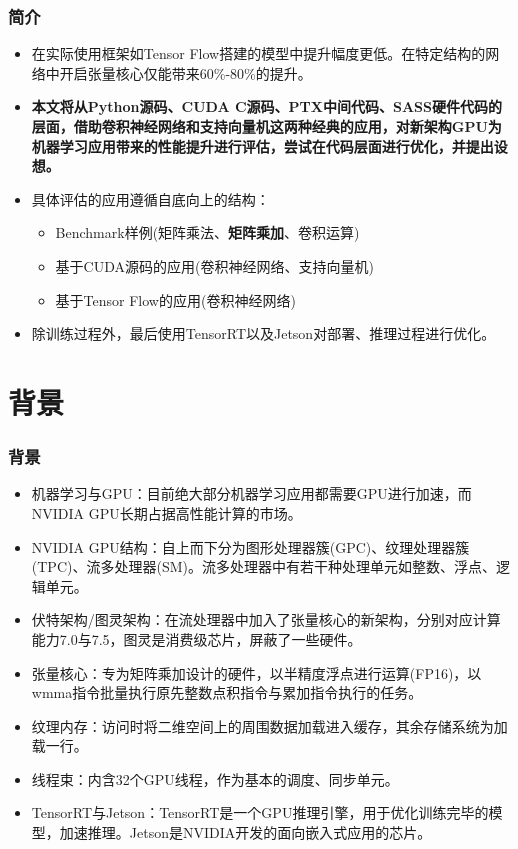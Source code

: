 \documentclass[10pt,aspectratio=169,mathserif]{beamer}
\begin{document}
	\begin{frame}
		\frametitle{简介}
		\begin{itemize}
			\item 在实际使用框架如Tensor Flow搭建的模型中提升幅度更低。在特定结构的网络中开启张量核心仅能带来60\%-80\%的提升。
			\item {\bf 本文将从Python源码、CUDA C源码、PTX中间代码、SASS硬件代码的层面，借助卷积神经网络和支持向量机这两种经典的应用，对新架构GPU为机器学习应用带来的性能提升进行评估，尝试在代码层面进行优化，并提出设想。}
			\item 具体评估的应用遵循自底向上的结构：
				\begin{itemize}
					\item Benchmark样例(矩阵乘法、\textbf{矩阵乘加}、卷积运算)
					\item 基于CUDA源码的应用(卷积神经网络、支持向量机)
					\item 基于Tensor Flow的应用(卷积神经网络)
				\end{itemize}
			\item 除训练过程外，最后使用TensorRT以及Jetson对部署、推理过程进行优化。
		\end{itemize}
	\end{frame}

	\section{背景}
	\begin{frame}
		\frametitle{背景}
		\begin{itemize}
			\item 机器学习与GPU：目前绝大部分机器学习应用都需要GPU进行加速，而NVIDIA GPU长期占据高性能计算的市场。
			\item NVIDIA GPU结构：自上而下分为图形处理器簇(GPC)、纹理处理器簇(TPC)、流多处理器(SM)。流多处理器中有若干种处理单元如整数、浮点、逻辑单元。
			\item 伏特架构/图灵架构：在流处理器中加入了张量核心的新架构，分别对应计算能力7.0与7.5，图灵是消费级芯片，屏蔽了一些硬件。
			\item 张量核心：专为矩阵乘加设计的硬件，以半精度浮点进行运算(FP16)，以wmma指令批量执行原先整数点积指令与累加指令执行的任务。
			\item 纹理内存：访问时将二维空间上的周围数据加载进入缓存，其余存储系统为加载一行。
			\item 线程束：内含32个GPU线程，作为基本的调度、同步单元。
			\item TensorRT与Jetson：TensorRT是一个GPU推理引擎，用于优化训练完毕的模型，加速推理。Jetson是NVIDIA开发的面向嵌入式应用的芯片。
		\end{itemize}
	\end{frame}
\end{document}
